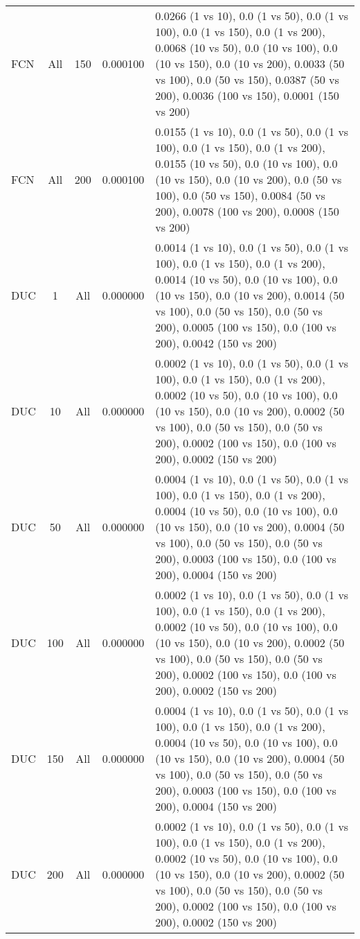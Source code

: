 \begin{tabular}{|l|c|c|c|p{7cm}|}
FCN & All & 150 & 0.000100 & 0.0266 (1 vs 10), 0.0 (1 vs 50), 0.0 (1 vs 100), 0.0 (1 vs 150), 0.0 (1 vs 200), 0.0068 (10 vs 50), 0.0 (10 vs 100), 0.0 (10 vs 150), 0.0 (10 vs 200), 0.0033 (50 vs 100), 0.0 (50 vs 150), 0.0387 (50 vs 200), 0.0036 (100 vs 150), 0.0001 (150 vs 200) \\
FCN & All & 200 & 0.000100 & 0.0155 (1 vs 10), 0.0 (1 vs 50), 0.0 (1 vs 100), 0.0 (1 vs 150), 0.0 (1 vs 200), 0.0155 (10 vs 50), 0.0 (10 vs 100), 0.0 (10 vs 150), 0.0 (10 vs 200), 0.0 (50 vs 100), 0.0 (50 vs 150), 0.0084 (50 vs 200), 0.0078 (100 vs 200), 0.0008 (150 vs 200) \\
DUC & 1 & All & 0.000000 & 0.0014 (1 vs 10), 0.0 (1 vs 50), 0.0 (1 vs 100), 0.0 (1 vs 150), 0.0 (1 vs 200), 0.0014 (10 vs 50), 0.0 (10 vs 100), 0.0 (10 vs 150), 0.0 (10 vs 200), 0.0014 (50 vs 100), 0.0 (50 vs 150), 0.0 (50 vs 200), 0.0005 (100 vs 150), 0.0 (100 vs 200), 0.0042 (150 vs 200) \\
DUC & 10 & All & 0.000000 & 0.0002 (1 vs 10), 0.0 (1 vs 50), 0.0 (1 vs 100), 0.0 (1 vs 150), 0.0 (1 vs 200), 0.0002 (10 vs 50), 0.0 (10 vs 100), 0.0 (10 vs 150), 0.0 (10 vs 200), 0.0002 (50 vs 100), 0.0 (50 vs 150), 0.0 (50 vs 200), 0.0002 (100 vs 150), 0.0 (100 vs 200), 0.0002 (150 vs 200) \\
DUC & 50 & All & 0.000000 & 0.0004 (1 vs 10), 0.0 (1 vs 50), 0.0 (1 vs 100), 0.0 (1 vs 150), 0.0 (1 vs 200), 0.0004 (10 vs 50), 0.0 (10 vs 100), 0.0 (10 vs 150), 0.0 (10 vs 200), 0.0004 (50 vs 100), 0.0 (50 vs 150), 0.0 (50 vs 200), 0.0003 (100 vs 150), 0.0 (100 vs 200), 0.0004 (150 vs 200) \\
DUC & 100 & All & 0.000000 & 0.0002 (1 vs 10), 0.0 (1 vs 50), 0.0 (1 vs 100), 0.0 (1 vs 150), 0.0 (1 vs 200), 0.0002 (10 vs 50), 0.0 (10 vs 100), 0.0 (10 vs 150), 0.0 (10 vs 200), 0.0002 (50 vs 100), 0.0 (50 vs 150), 0.0 (50 vs 200), 0.0002 (100 vs 150), 0.0 (100 vs 200), 0.0002 (150 vs 200) \\
DUC & 150 & All & 0.000000 & 0.0004 (1 vs 10), 0.0 (1 vs 50), 0.0 (1 vs 100), 0.0 (1 vs 150), 0.0 (1 vs 200), 0.0004 (10 vs 50), 0.0 (10 vs 100), 0.0 (10 vs 150), 0.0 (10 vs 200), 0.0004 (50 vs 100), 0.0 (50 vs 150), 0.0 (50 vs 200), 0.0003 (100 vs 150), 0.0 (100 vs 200), 0.0004 (150 vs 200) \\
DUC & 200 & All & 0.000000 & 0.0002 (1 vs 10), 0.0 (1 vs 50), 0.0 (1 vs 100), 0.0 (1 vs 150), 0.0 (1 vs 200), 0.0002 (10 vs 50), 0.0 (10 vs 100), 0.0 (10 vs 150), 0.0 (10 vs 200), 0.0002 (50 vs 100), 0.0 (50 vs 150), 0.0 (50 vs 200), 0.0002 (100 vs 150), 0.0 (100 vs 200), 0.0002 (150 vs 200) \\

\end{tabular}
